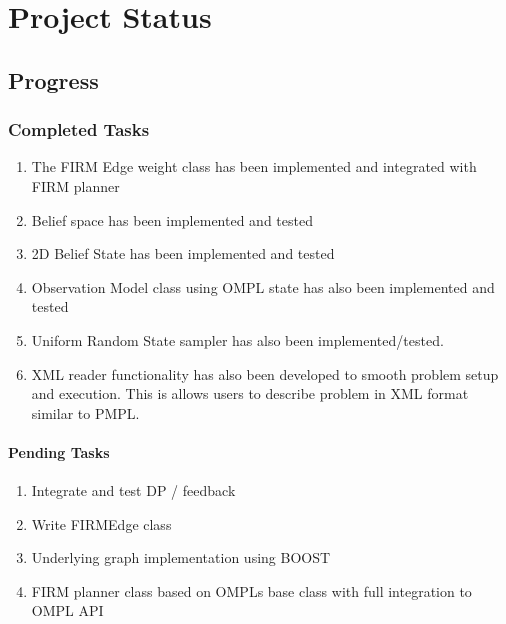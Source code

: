 \chapter{Project Status}

\section{Progress}

\subsection{Completed Tasks}

\begin{enumerate}
 \item The FIRM Edge weight class has been implemented and integrated with FIRM planner
 \item Belief space has been implemented and tested
 \item 2D Belief State has been implemented and tested
 \item Observation Model class using OMPL state has also been implemented and tested
 \item Uniform Random State sampler has also been implemented/tested.
 \item XML reader functionality has also been developed to smooth problem setup and execution. 
	This is allows users to describe problem in XML format similar to PMPL.
\end{enumerate}

\subsubsection{Pending Tasks}
  
\begin{enumerate}
 \item Integrate and test DP /  feedback
 \item Write FIRMEdge class
 \item Underlying graph implementation using BOOST
 \item FIRM planner class based on OMPLs base class with full integration to OMPL API
\end{enumerate}
